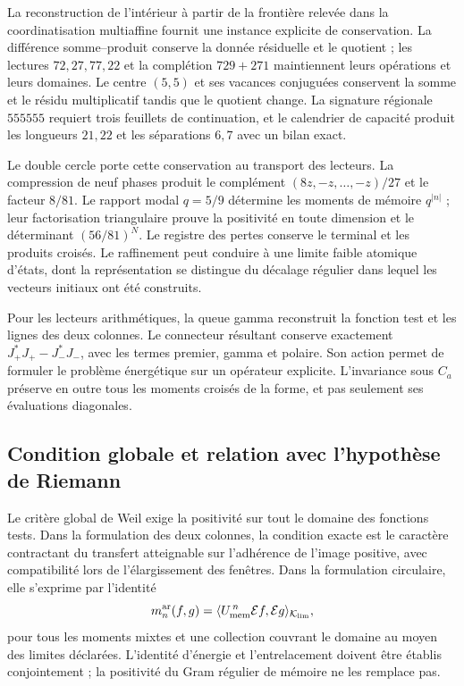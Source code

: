 La reconstruction de l'intérieur à partir de la frontière relevée dans la coordinatisation multiaffine fournit une instance explicite de conservation. La différence somme--produit conserve la donnée résiduelle et le quotient ; les lectures $72,27,77,22$ et la complétion $729+271$ maintiennent leurs opérations et leurs domaines. Le centre $(5,5)$ et ses vacances conjuguées conservent la somme et le résidu multiplicatif tandis que le quotient change. La signature régionale $555555$ requiert trois feuillets de continuation, et le calendrier de capacité produit les longueurs $21,22$ et les séparations $6,7$ avec un bilan exact.

Le double cercle porte cette conservation au transport des lecteurs. La compression de neuf phases produit le complément $(8z,-z,\ldots,-z)/27$ et le facteur $8/81$. Le rapport modal $q=5/9$ détermine les moments de mémoire $q^{|n|}$ ; leur factorisation triangulaire prouve la positivité en toute dimension et le déterminant $(56/81)^N$. Le registre des pertes conserve le terminal et les produits croisés. Le raffinement peut conduire à une limite faible atomique d'états, dont la représentation se distingue du décalage régulier dans lequel les vecteurs initiaux ont été construits.

Pour les lecteurs arithmétiques, la queue gamma reconstruit la
fonction test et les lignes des deux colonnes. Le connecteur résultant
conserve exactement
$J_+^*J_+-J_-^*J_-$, avec les termes premier, gamma et polaire.
Son action permet de formuler le problème énergétique sur un
opérateur explicite. L'invariance sous $C_a$ préserve en outre
tous les moments croisés de la forme, et pas seulement ses
évaluations diagonales.

\subsection*{Condition globale et relation avec l’hypothèse de Riemann}

Le critère global de Weil exige la positivité sur tout le domaine des fonctions tests. Dans la formulation des deux colonnes, la condition exacte est le caractère contractant du transfert atteignable sur l'adhérence de l'image positive, avec compatibilité lors de l'élargissement des fenêtres. Dans la formulation circulaire, elle s'exprime par l'identité
\[
m_n^{\rm ar}(f,g)
=\langle U_{\rm mem}^{\,n}\mathcal E f,
          \mathcal E g\rangle_{\mathcal K_{\rm lim}},
\]
pour tous les moments mixtes et une collection couvrant le domaine au moyen des limites déclarées. L'identité d'énergie et l'entrelacement doivent être établis conjointement ; la positivité du Gram régulier de mémoire ne les remplace pas.

